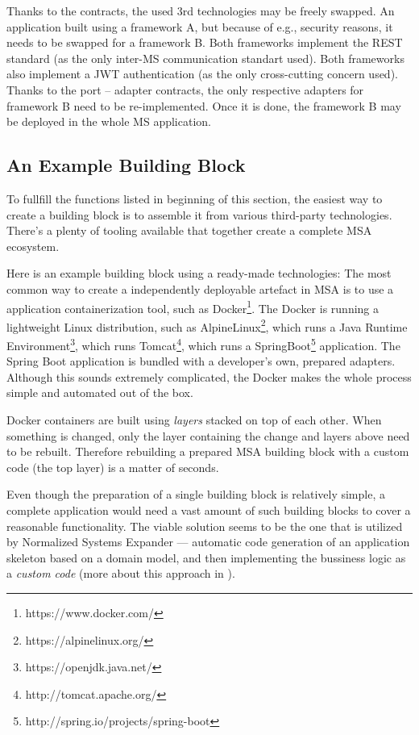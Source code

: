 \documentclass[thesis=M,english,hidelinks]{FITthesis}[2012/10/20]
\begin{document}
Thanks to the contracts, the used 3rd technologies may be freely swapped. An application built using a framework A, but because of e.g., security reasons, it needs to be swapped for a framework B. Both frameworks implement the REST standard (as the only inter-MS communication standart used). Both frameworks also implement a \acrfull{JWT} authentication (as the only cross-cutting concern used). Thanks to the port -- adapter contracts, the only respective adapters for framework B need to be re-implemented. Once it is done, the framework B may be deployed in the whole \acrshort{MS} application.

\subsection{An Example Building Block}
To fullfill the functions listed in beginning of this section, the easiest way to create a building block is to assemble it from various third-party technologies. There's a plenty of tooling available that together create a complete \acrshort{MSA} ecosystem.

Here is an example building block using a ready-made technologies: The most common way to create a independently deployable artefact in \acrshort{MSA} is to use a application containerization tool, such as Docker\footnote{https://www.docker.com/}. The Docker is running a lightweight Linux distribution, such as AlpineLinux\footnote{https://alpinelinux.org/}, which runs a Java Runtime Environment\footnote{https://openjdk.java.net/}, which runs Tomcat\footnote{http://tomcat.apache.org/}, which runs a SpringBoot\footnote{http://spring.io/projects/spring-boot} application. The Spring Boot application is bundled with a developer's own, prepared adapters. Although this sounds extremely complicated, the Docker makes the whole process simple and automated out of the box.

Docker containers are built using \textit{layers} stacked on top of each other. When something is changed, only the layer containing the change and layers above need to be rebuilt. Therefore rebuilding a prepared \acrshort{MSA} building block with a custom code (the top layer) is a matter of seconds.

Even though the preparation of a single building block is relatively simple, a complete application would need a vast amount of such building blocks to cover a reasonable functionality. The viable solution seems to be the one that is utilized by Normalized Systems Expander --- automatic code generation of an application skeleton based on a domain model, and then implementing the bussiness logic as a \textit{custom code} (more about this approach in \cite{ns-toward-general-theory}). 
\end{document}
